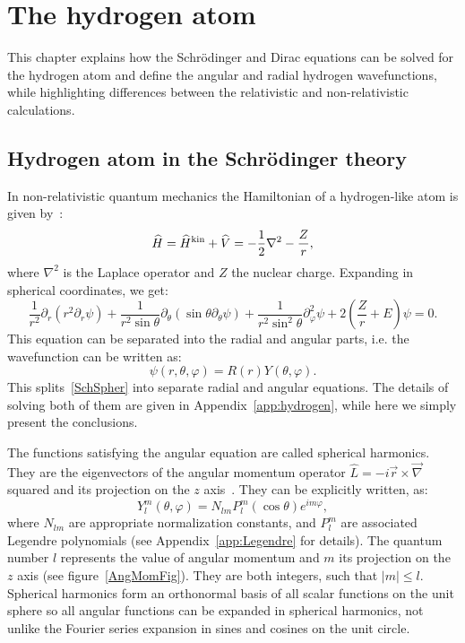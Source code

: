 \chapter{The hydrogen atom}
\label{ch:basics}

This chapter explains how the Schr\"odinger and Dirac equations can be solved for the hydrogen atom and define the angular and radial hydrogen wavefunctions, while highlighting differences between the relativistic and non-relativistic calculations.

\section{Hydrogen atom in the Schr\"odinger theory}
In non-relativistic quantum mechanics the Hamiltonian of a hydrogen-like atom is given by~\cite{LandauQM}:
\begin{equation}\label{SchH}
\widehat{H}=\widehat{H}^{\rm{kin}} + \widehat{V} = -\frac{1}{2}\nabla^2 - \frac{Z}{r},
\end{equation}
where $\nabla^2$ is the Laplace operator and $Z$ the nuclear charge. Expanding in spherical coordinates, we get:
\begin{equation}\label{SchSpher}
	\frac{1}{r^2}\partial_r(r^2 \partial_r \psi)+\frac{1}{r^2 \sin \theta}\partial_\theta(\sin \theta \partial_\theta \psi)+\frac{1}{r^2\sin^2 \theta} \partial_{\varphi}^2 \psi+2\left(\frac{Z}{r}+E\right)\psi = 0.
\end{equation}
This equation can be separated into the radial and angular parts, i.e. the wavefunction can be written as:
\begin{equation}
	\psi(r,\theta,\varphi) = R(r)Y(\theta,\varphi).
\end{equation}
This splits~\eqref{SchSpher} into separate radial and angular equations. The details of solving both of them are given in Appendix~\ref{app:hydrogen}, while here we simply present the conclusions.

The functions satisfying the angular equation are called spherical harmonics. They are the eigenvectors of the angular momentum operator $\widehat{L} = -i \vec{r} \times \vec{\nabla}$ squared and its projection on the $z$ axis~\cite{biedenharn1984angular}. They can be explicitly written, as:
\begin{equation}
	Y_l^m (\theta, \varphi)=N_{lm}P_l^m(\cos \theta)e^{i m \varphi},
\end{equation}
where $N_{lm}$ are appropriate normalization constants, and $P_l^m$ are associated Legendre polynomials (see Appendix~\ref{app:Legendre} for details). The quantum number $l$ represents the value of angular momentum and $m$ its projection on the $z$ axis (see figure~\ref{AngMomFig}). They are both integers, such that $|m|\leq l$. Spherical harmonics form an orthonormal basis of all scalar functions on the unit sphere so all angular functions can be expanded in spherical harmonics, not unlike the Fourier series expansion in sines and cosines on the unit circle.

